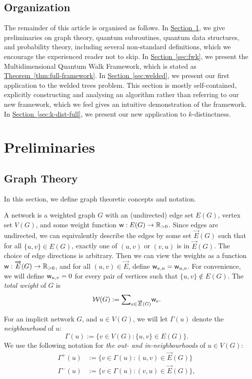 \documentclass{article}
\renewcommand{\sec}[1]{\hyperref[sec:#1]{Section~\ref*{sec:#1}}}
\newcommand{\thm}[1]{\hyperref[thm:#1]{Theorem~\ref*{thm:#1}}}
\renewcommand{\>}{\rangle}
\newcommand{\<}{\langle}
\renewcommand{\(}{\left(}
\renewcommand{\)}{\right)}
\def\w{{\sf w}}
\begin{document}
\subsection{Organization}

The remainder of this article is organised as follows. In \sec{prelim}, we give preliminaries on graph theory, quantum subroutines, quantum data structures, and probability theory, including several non-standard definitions, which we encourage the experienced reader not to skip. In \sec{fwk}, we present the Multidimensional Quantum Walk Framework, which is stated as \thm{full-framework}. In \sec{welded}, we present our first application to the welded trees problem. This section is mostly self-contained, explicitly constructing and analysing an algorithm rather than referring to our new framework, which we feel gives an intuitive demonstration of the framework. In \sec{k-dist-full}, we present our new application to $k$-distinctness.

\section{Preliminaries}\label{sec:prelim}

\subsection{Graph Theory}\label{sec:prelim-graph}

In this section, we define graph theoretic concepts and notation. 


\begin{definition}[Network]\label{def:network}
A network is a weighted graph $G$ with an (undirected) edge set $E(G)$, vertex set $V(G)$, and some weight function $\w:E(G)\rightarrow\mathbb{R}_{>0}$. Since edges are undirected, we can equivalently describe the edges by some set $\overrightarrow{E}(G)$ such that for all $\{u,v\}\in E(G)$, exactly one of $(u,v)$ or $(v,u)$ is in $\overrightarrow{E}(G)$. The choice of edge directions is arbitrary. Then we can view the weights as a function $\w:\overrightarrow{E}(G)\rightarrow\mathbb{R}_{> 0}$, and for all $(u,v)\in \overrightarrow{E}$, define $\w_{v,u}=\w_{u,v}$. For convenience, we will define $\w_{u,v}=0$ for every pair of vertices such that $\{u,v\}\not\in E(G)$. 
The \emph{total weight} of $G$ is 
$$\textstyle{\cal W}(G):={\displaystyle\sum}_{e\in \overrightarrow{E}(G)}\w_e.$$ 
\end{definition}

\noindent For an implicit network $G$, and $u\in V(G)$, we will let $\Gamma(u)$ denote the \emph{neighbourhood} of $u$:
$$\Gamma(u):=\{v\in V(G):\{u,v\}\in E(G)\}.$$
We use the following notation for \emph{the out- and in-neighbourhoods} of $u\in V(G)$:
\begin{equation}
\begin{split}
\Gamma^+(u) &:= \{v\in\Gamma(u):(u,v)\in \overrightarrow{E}(G)\}\\
\Gamma^-(u) &:= \{v\in\Gamma(u):(v,u)\in \overrightarrow{E}(G)\},
\end{split}\label{eq:neighbourhoods}
\end{equation}
\end{document}
